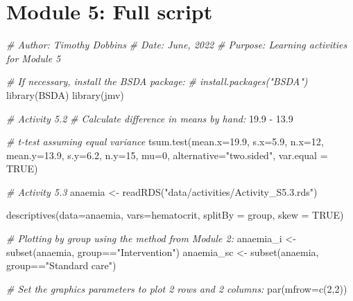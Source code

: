 \documentclass[
]{memoir}
\newenvironment{Shaded}{\begin{snugshade}}{\end{snugshade}}
\newcommand{\AttributeTok}[1]{\textcolor[rgb]{0.77,0.63,0.00}{#1}}
\newcommand{\CommentTok}[1]{\textcolor[rgb]{0.56,0.35,0.01}{\textit{#1}}}
\newcommand{\ConstantTok}[1]{\textcolor[rgb]{0.00,0.00,0.00}{#1}}
\newcommand{\DecValTok}[1]{\textcolor[rgb]{0.00,0.00,0.81}{#1}}
\newcommand{\FloatTok}[1]{\textcolor[rgb]{0.00,0.00,0.81}{#1}}
\newcommand{\FunctionTok}[1]{\textcolor[rgb]{0.00,0.00,0.00}{#1}}
\newcommand{\NormalTok}[1]{#1}
\newcommand{\OtherTok}[1]{\textcolor[rgb]{0.56,0.35,0.01}{#1}}
\newcommand{\SpecialCharTok}[1]{\textcolor[rgb]{0.00,0.00,0.00}{#1}}
\newcommand{\StringTok}[1]{\textcolor[rgb]{0.31,0.60,0.02}{#1}}
\begin{document}
\hypertarget{module-5-full-script}{%
\chapter*{Module 5: Full script}\label{module-5-full-script}}

\begin{Shaded}
\begin{Highlighting}[]
\CommentTok{\# Author: Timothy Dobbins}
\CommentTok{\# Date: June, 2022}
\CommentTok{\# Purpose: Learning activities for Module 5}

\CommentTok{\# If necessary, install the BSDA package:}
\CommentTok{\# install.packages("BSDA")}
\FunctionTok{library}\NormalTok{(BSDA)}
\FunctionTok{library}\NormalTok{(jmv)}

\CommentTok{\# Activity 5.2}
\CommentTok{\# Calculate difference in means by hand:}
\FloatTok{19.9} \SpecialCharTok{{-}} \FloatTok{13.9}

\CommentTok{\# t{-}test assuming equal variance}
\FunctionTok{tsum.test}\NormalTok{(}\AttributeTok{mean.x=}\FloatTok{19.9}\NormalTok{, }\AttributeTok{s.x=}\FloatTok{5.9}\NormalTok{, }\AttributeTok{n.x=}\DecValTok{12}\NormalTok{,}
          \AttributeTok{mean.y=}\FloatTok{13.9}\NormalTok{, }\AttributeTok{s.y=}\FloatTok{6.2}\NormalTok{, }\AttributeTok{n.y=}\DecValTok{15}\NormalTok{,}
          \AttributeTok{mu=}\DecValTok{0}\NormalTok{, }\AttributeTok{alternative=}\StringTok{"two.sided"}\NormalTok{, }\AttributeTok{var.equal =} \ConstantTok{TRUE}\NormalTok{)}

\CommentTok{\# Activity 5.3}
\NormalTok{anaemia }\OtherTok{\textless{}{-}} \FunctionTok{readRDS}\NormalTok{(}\StringTok{"data/activities/Activity\_S5.3.rds"}\NormalTok{)}

\FunctionTok{descriptives}\NormalTok{(}\AttributeTok{data=}\NormalTok{anaemia, }\AttributeTok{vars=}\NormalTok{hematocrit,}
             \AttributeTok{splitBy =}\NormalTok{ group,}
             \AttributeTok{skew =} \ConstantTok{TRUE}\NormalTok{)}

\CommentTok{\# Plotting by group using the method from Module 2:}
\NormalTok{anaemia\_i }\OtherTok{\textless{}{-}} \FunctionTok{subset}\NormalTok{(anaemia, group}\SpecialCharTok{==}\StringTok{"Intervention"}\NormalTok{)}
\NormalTok{anaemia\_sc }\OtherTok{\textless{}{-}} \FunctionTok{subset}\NormalTok{(anaemia, group}\SpecialCharTok{==}\StringTok{"Standard care"}\NormalTok{)}

\CommentTok{\# Set the graphics parameters to plot 2 rows and 2 columns:}
\FunctionTok{par}\NormalTok{(}\AttributeTok{mfrow=}\FunctionTok{c}\NormalTok{(}\DecValTok{2}\NormalTok{,}\DecValTok{2}\NormalTok{))}


\end{Highlighting}
\end{Shaded}
\end{document}

